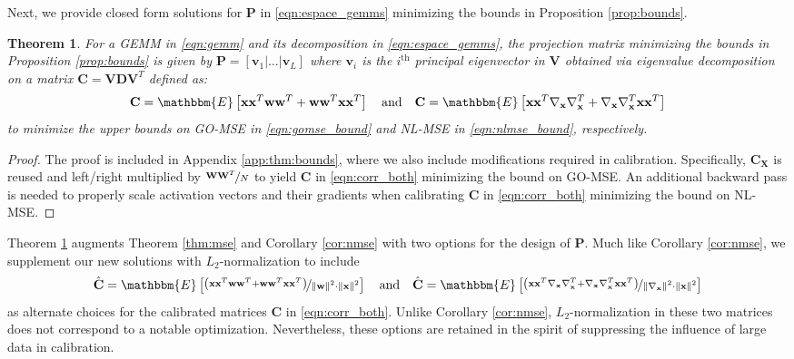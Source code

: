 \documentclass{article}
\theoremstyle{plain}
\newtheorem{theorem}{Theorem}
\begin{document}
Next, we provide closed form solutions for $\mathbf{P}$ in \eqref{eqn:espace_gemms} minimizing the bounds in Proposition \ref{prop:bounds}.

\begin{theorem}
    \label{thm:bounds}
    For a GEMM in \eqref{eqn:gemm} and its decomposition in \eqref{eqn:espace_gemms}, the projection matrix minimizing the bounds in Proposition \ref{prop:bounds} is given by $\mathbf{P} = \left[\mathbf{v}_1 | \ldots | \mathbf{v}_L  \right]$ where $\mathbf{v}_i$ is the $i^\text{th}$ principal eigenvector in $\mathbf{V}$ obtained via eigenvalue decomposition on a matrix $\mathbf{C} = \mathbf{V}\mathbf{D}\mathbf{V}^T$ defined as:
    \begin{align}
        \label{eqn:corr_both}
        \mathbf{C}=\mathbbm{E}\left[\mathbf{x}\mathbf{x}^T\mathbf{w}\mathbf{w}^T+\mathbf{w}\mathbf{w}^T\mathbf{x}\mathbf{x}^T\right] \quad \text{and} \quad \mathbf{C}=\mathbbm{E}\left[\mathbf{x}\mathbf{x}^T\mathbf{\nabla}_{\mathbf{x}}\mathbf{\nabla}_{\mathbf{x}}^T+\mathbf{\nabla}_{\mathbf{x}}\mathbf{\nabla}_{\mathbf{x}}^T\mathbf{x}\mathbf{x}^T\right]
    \end{align}
    to minimize the upper bounds on GO-MSE in \eqref{eqn:gomse_bound} and NL-MSE in \eqref{eqn:nlmse_bound}, respectively.
\end{theorem}
\begin{proof} The proof is included in Appendix \ref{app:thm:bounds}, where we also include modifications required in calibration. Specifically, $\mathbf{C}_\mathbf{X}$ is reused and left/right multiplied by $\nicefrac{\mathbf{W}\mathbf{W}^T}{N}$ to yield $\mathbf{C}$ in \eqref{eqn:corr_both} minimizing the bound on GO-MSE. An additional backward pass is needed to properly scale activation vectors and their gradients when calibrating $\mathbf{C}$ in \eqref{eqn:corr_both} minimizing the bound on NL-MSE.
\end{proof}

Theorem \ref{thm:bounds} augments Theorem \ref{thm:mse} and Corollary \ref{cor:nmse} with two options for the design of $\mathbf{P}$. Much like Corollary \ref{cor:nmse}, we supplement our new solutions with $L_2$-normalization to include  $$\hat{\mathbf{C}}=\mathbbm{E}\left[\nicefrac{\left(\mathbf{x}\mathbf{x}^T\mathbf{w}\mathbf{w}^T+\mathbf{w}\mathbf{w}^T\mathbf{x}\mathbf{x}^T\right)}{\lVert \mathbf{w} \rVert^2 \cdot \lVert \mathbf{x} \rVert^2}\right] \quad \text{and} \quad \hat{\mathbf{C}}=\mathbbm{E}\left[\nicefrac{\left(\mathbf{x}\mathbf{x}^T\mathbf{\nabla}_{\mathbf{x}}\mathbf{\nabla}_{\mathbf{x}}^T+\mathbf{\nabla}_{\mathbf{x}}\mathbf{\nabla}_{\mathbf{x}}^T\mathbf{x}\mathbf{x}^T\right)}{\lVert \mathbf{\nabla}_{\mathbf{x}} \rVert^2 \cdot \lVert \mathbf{x} \rVert^2}\right]$$ as alternate choices for the calibrated matrices $\mathbf{C}$ in \eqref{eqn:corr_both}. Unlike Corollary \ref{cor:nmse}, $L_2$-normalization in these two matrices does not correspond to a notable optimization. Nevertheless, these options are retained in the spirit of suppressing the influence of large data in calibration.
\end{document}
